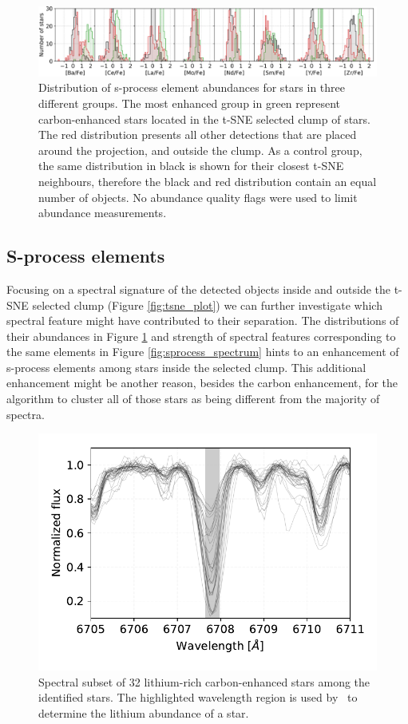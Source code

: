 \begin{figure}
	\centering
	\includegraphics[width=\textwidth]{sprocess_hist.png}
	\caption{Distribution of s-process element abundances for stars in three different groups. The most enhanced group in green represent carbon-enhanced stars located in the t-SNE selected clump of stars. The red distribution presents all other detections that are placed around the projection, and outside the clump. As a control group, the same distribution in black is shown for their closest t-SNE neighbours, therefore the black and red distribution contain an equal number of objects. No abundance quality flags were used to limit abundance measurements.}
	\label{fig:sprocess_hist}
\end{figure}

\subsection{S-process elements}
\label{sec:sprocess}
Focusing on a spectral signature of the detected objects inside and outside the t-SNE selected clump (Figure \ref{fig:tsne_plot}) we can further investigate which spectral feature might have contributed to their separation. The distributions of their abundances in Figure \ref{fig:sprocess_hist} and strength of spectral features corresponding to the same elements in Figure \ref{fig:sprocess_spectrum} hints to an enhancement of s-process elements among stars inside the selected clump. This additional enhancement might be another reason, besides the carbon enhancement, for the algorithm to cluster all of those stars as being different from the majority of spectra. 

\begin{figure}
	\centering
	\includegraphics[width=\columnwidth]{li_string_ch.pdf}
	\caption{Spectral subset of 32 lithium-rich carbon-enhanced stars among the identified stars. The highlighted wavelength region is used by \TC\ to determine the lithium abundance of a star.}
	\label{fig:li_abund}
\end{figure}	

